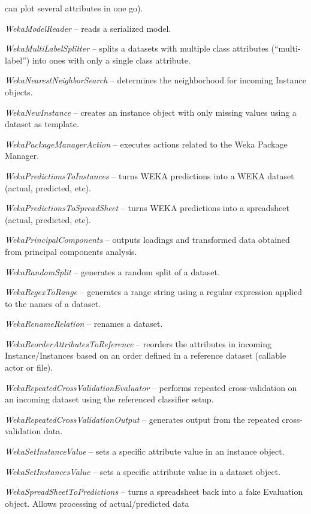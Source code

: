 \begin{tight_itemize}
	can plot several attributes in one go).
	\item \textit{WekaModelReader} -- reads a serialized model.
	\item \textit{WekaMultiLabelSplitter} -- splits a datasets with multiple
	class attributes (``multi-label'') into ones with only a single class 
	attribute.
	\item \textit{WekaNearestNeighborSearch} -- determines the neighborhood
	for incoming Instance objects.
	\item \textit{WekaNewInstance} -- creates an instance object with only
	missing values using a dataset as template.
	\item \textit{WekaPackageManagerAction} -- executes actions related to the Weka Package Manager.
	\item \textit{WekaPredictionsToInstances} -- turns WEKA predictions into
	a WEKA dataset (actual, predicted, etc).
	\item \textit{WekaPredictionsToSpreadSheet} -- turns WEKA predictions into
	a spreadsheet (actual, predicted, etc).
	\item \textit{WekaPrincipalComponents} -- outputs loadings and transformed
	data obtained from principal components analysis.
	\item \textit{WekaRandomSplit} -- generates a random split of a dataset.
	\item \textit{WekaRegexToRange} -- generates a range string using a regular
	expression applied to the names of a dataset.
	\item \textit{WekaRenameRelation} -- renames a dataset.
	\item \textit{WekaReorderAttributesToReference} -- reorders the attributes
	in incoming Instance/Instances based on an order defined in a reference
	dataset (callable actor or file).
	\item \textit{WekaRepeatedCrossValidationEvaluator} -- performs repeated
	cross-validation on an incoming dataset using the referenced classifier setup.
	\item \textit{WekaRepeatedCrossValidationOutput} -- generates output
	from the repeated cross-validation data.
	\item \textit{WekaSetInstanceValue} -- sets a specific attribute value in
	an instance object.
	\item \textit{WekaSetInstancesValue} -- sets a specific attribute value in
	a dataset object.
	\item \textit{WekaSpreadSheetToPredictions} -- turns a spreadsheet back
	into a fake Evaluation object. Allows processing of actual/predicted data

\end{tight_itemize}
